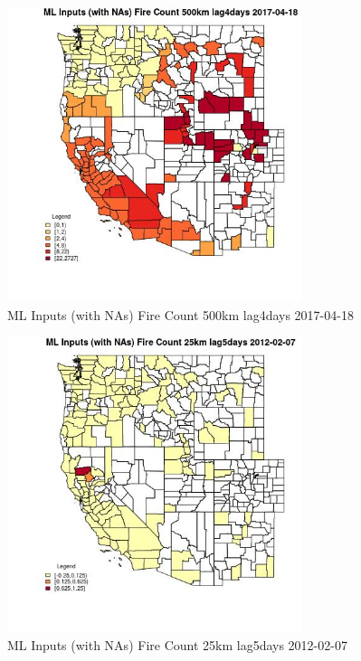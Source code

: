 \begin{figure} 
\centering  
\includegraphics[width=0.77\textwidth]{Code_Outputs/Report_ML_input_PM25_Step4_part_f_de_duplicated_aves_prioritize_24hr_obswNAs_CountyFire_Count_500km_lag4daysMean2017-04-18.jpg} 
\caption{\label{fig:Report_ML_input_PM25_Step4_part_f_de_duplicated_aves_prioritize_24hr_obswNAsCountyFire_Count_500km_lag4daysMean2017-04-18}ML Inputs (with NAs) Fire Count 500km lag4days 2017-04-18} 
\end{figure} 
 

\clearpage 

\begin{figure} 
\centering  
\includegraphics[width=0.77\textwidth]{Code_Outputs/Report_ML_input_PM25_Step4_part_f_de_duplicated_aves_prioritize_24hr_obswNAs_CountyFire_Count_25km_lag5daysMean2012-02-07.jpg} 
\caption{\label{fig:Report_ML_input_PM25_Step4_part_f_de_duplicated_aves_prioritize_24hr_obswNAsCountyFire_Count_25km_lag5daysMean2012-02-07}ML Inputs (with NAs) Fire Count 25km lag5days 2012-02-07} 
\end{figure} 
 

